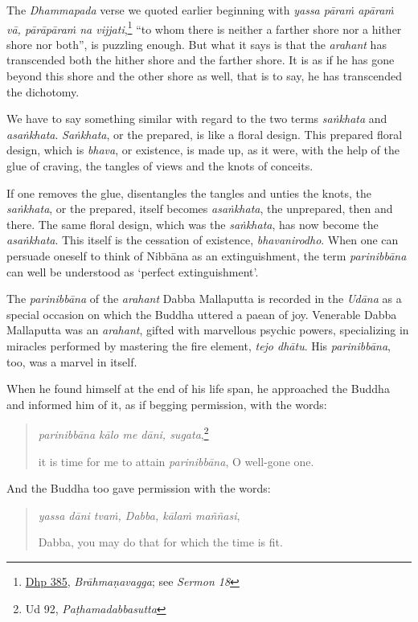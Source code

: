 The \emph{Dhammapada} verse we quoted earlier beginning with \emph{yassa pāraṁ apāraṁ vā, pārāpāraṁ na vijjati},\footnote{\href{https://suttacentral.net/dhp383-423/pli/ms}{Dhp 385}, \emph{Brāhmaṇavagga}; see \emph{Sermon 18}} ``to whom there is neither a farther shore nor a hither shore nor both'', is puzzling enough. But what it says is that the \emph{arahant} has transcended both the hither shore and the farther shore. It is as if he has gone beyond this shore and the other shore as well, that is to say, he has transcended the dichotomy.

We have to say something similar with regard to the two terms \emph{saṅkhata} and \emph{asaṅkhata}. \emph{Saṅkhata}, or the prepared, is like a floral design. This prepared floral design, which is \emph{bhava}, or existence, is made up, as it were, with the help of the glue of craving, the tangles of views and the knots of conceits.

If one removes the glue, disentangles the tangles and unties the knots, the \emph{saṅkhata}, or the prepared, itself becomes \emph{asaṅkhata}, the unprepared, then and there. The same floral design, which was the \emph{saṅkhata}, has now become the \emph{asaṅkhata}. This itself is the cessation of existence, \emph{bhavanirodho}. When one can persuade oneself to think of Nibbāna as an extinguishment, the term \emph{parinibbāna} can well be understood as `perfect extinguishment'.

The \emph{parinibbāna} of the \emph{arahant} Dabba Mallaputta is recorded in the \emph{Udāna} as a special occasion on which the Buddha uttered a paean of joy. Venerable Dabba Mallaputta was an \emph{arahant}, gifted with marvellous psychic powers, specializing in miracles performed by mastering the fire element, \emph{tejo dhātu}. His \emph{parinibbāna}, too, was a marvel in itself.

When he found himself at the end of his life span, he approached the Buddha and informed him of it, as if begging permission, with the words:

\begin{quote}
\emph{parinibbāna kālo me dāni, sugata},\footnote{Ud 92, \emph{Paṭhamadabbasutta}}

it is time for me to attain \emph{parinibbāna}, O well-gone one.
\end{quote}

And the Buddha too gave permission with the words:

\begin{quote}
\emph{yassa dāni tvaṁ, Dabba, kālaṁ maññasi},

Dabba, you may do that for which the time is fit.
\end{quote}

